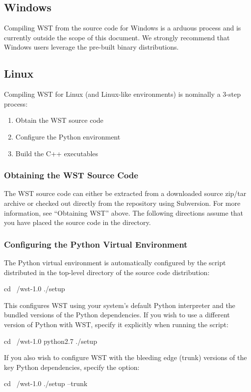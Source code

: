 \subsection{Windows}

Compiling WST from the source code for Windows is a arduous process and is
currently outside the scope of this document. We strongly recommend
that Windows users leverage the pre-built binary distributions.

\subsection{Linux}

Compiling WST for Linux (and Linux-like environments) is nominally a
3-step process:
\begin{enumerate}
\item Obtain the WST source code
\item Configure the Python environment
\item Build the C++ executables
\end{enumerate}

\subsubsection{Obtaining the WST Source Code}
The WST source code can either be extracted from a downloaded source zip/tar
archive or checked out directly from the repository using Subversion.
For more information, see ``Obtaining WST'' above. The following
directions assume that you have placed the source code in the
directory.

\subsubsection{Configuring the Python Virtual Environment}
The Python virtual environment is automatically configured by the
 script distributed in the top-level directory of the
source code distribution:
\begin{unknownListing}
cd ~/wst-1.0
./setup
\end{unknownListing}
This configures WST using your system's default Python interpreter and
the bundled versions of the Python dependencies. If you wish to use a
different version of Python with WST, specify it explicitly when running
the  script:
\begin{unknownListing}
cd ~/wst-1.0
python2.7 ./setup
\end{unknownListing}
If you also wish to configure WST with the bleeding edge (trunk)
versions of the key Python dependencies, specify the 
option:
\begin{unknownListing}
cd ~/wst-1.0
./setup --trunk
\end{unknownListing}

